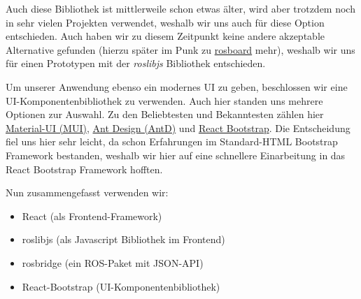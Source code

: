 \begin{flushleft}
    Auch diese Bibliothek ist mittlerweile schon etwas älter, wird aber trotzdem noch in sehr vielen Projekten verwendet, weshalb wir uns auch für diese Option entschieden. Auch haben wir zu diesem Zeitpunkt keine andere akzeptable Alternative gefunden (hierzu später im Punk zu \hyperlink{rosboard-target}{rosboard} mehr), weshalb wir uns für einen Prototypen mit der \textit{roslibjs} Bibliothek entschieden. 

    Um unserer Anwendung ebenso ein modernes UI zu geben, beschlossen wir eine UI-Komponentenbibliothek zu verwenden. Auch hier standen uns mehrere Optionen zur Auswahl. Zu den Beliebtesten und Bekanntesten zählen hier \href{https://mui.com}{Material-UI (MUI)}, \href{https://ant.design}{Ant Design (AntD)} und \href{https://react-bootstrap.github.io}{React Bootstrap}. Die Entscheidung fiel uns hier sehr leicht, da schon Erfahrungen im Standard-HTML Bootstrap Framework bestanden, weshalb wir hier auf eine schnellere Einarbeitung in das React Bootstrap Framework hofften.

    Nun zusammengefasst verwenden wir:
    \begin{itemize}
        \item React (als Frontend-Framework) \cite{reactframework}
        \item roslibjs (als Javascript Bibliothek im Frontend) \cite{roslibjs_robotwebtools}
        \item rosbridge (ein ROS-Paket mit JSON-API) \cite{rosbridgepackage}
        \item React-Bootstrap (UI-Komponentenbibliothek) \cite{reactbootstrap}
    \end{itemize}
\end{flushleft}